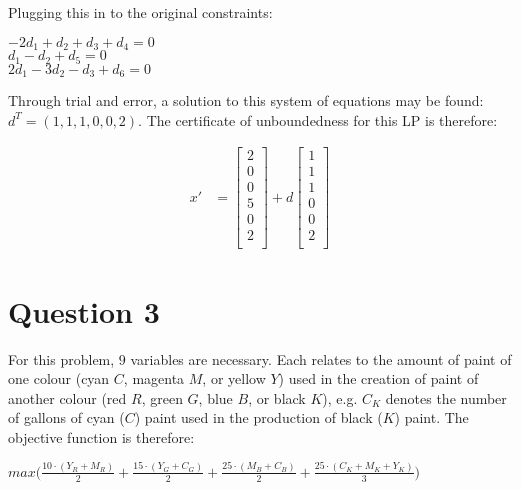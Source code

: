 \documentclass[11pt]{article} %
\begin{document}
Plugging this in to the original constraints:

\begin{center}

$-2d_1 + d_2 + d_3 + d_4 = 0$ \\
$d_1 - d_2 + d_5 = 0$ \\
$2d_1 - 3d_2 - d_3 + d_6 = 0$

\end{center}

Through trial and error, a solution to this system of equations may be found: $d^T = (1, 1, 1, 0, 0, 2)$. The certificate of unboundedness for this LP is therefore:

\begin{align}
    x' &= \begin{bmatrix}
           2 \\
           0 \\
           0 \\
           5 \\
		0 \\
		2 \\
         \end{bmatrix}
	+ d \begin{bmatrix}
           1 \\
           1 \\
           1 \\
           0 \\
		0 \\
		2 \\
         \end{bmatrix}
\end{align}

\section*{Question 3}

For this problem, $9$ variables are necessary. Each relates to the amount of paint of one colour (cyan $C$, magenta $M$, or yellow $Y$) used in the creation of paint of another colour (red $R$, green $G$, blue $B$, or black $K$), e.g. $C_K$ denotes the number of gallons of cyan ($C$) paint used in the production of black ($K$) paint. The objective function is therefore:

\begin{center}

$max \bigl( \frac{10 \cdot (Y_R + M_R)}{2} + \frac{15 \cdot (Y_G + C_G)}{2} + \frac{25 \cdot (M_B + C_B)}{2} + \frac{25 \cdot (C_K + M_K + Y_K)}{3}\bigr)$

\end{center}
\end{document}
